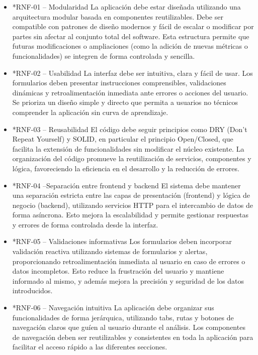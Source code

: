 \begin{itemize}

    \item*{RNF-01 – Modularidad}
    La aplicación debe estar diseñada utilizando una arquitectura modular basada en componentes reutilizables. Debe ser compatible con patrones de diseño modernos y fácil de escalar o modificar por partes sin afectar al conjunto total del software. Esta estructura permite que futuras modificaciones o ampliaciones (como la adición de nuevas métricas o funcionalidades) se integren de forma controlada y sencilla.
    
    \item*{RNF-02 – Usabilidad}
    La interfaz debe ser intuitiva, clara y fácil de usar. Los formularios deben presentar instrucciones comprensibles, validaciones dinámicas y retroalimentación inmediata ante errores o acciones del usuario. Se prioriza un diseño simple y directo que permita a usuarios no técnicos comprender la aplicación sin curva de aprendizaje.
    
    \item*{RNF-03 – Reusabilidad}
    El código debe seguir principios como DRY (Don’t Repeat Yourself) y SOLID, en particular el principio Open/Closed, que facilita la extensión de funcionalidades sin modificar el núcleo existente. La organización del código promueve la reutilización de servicios, componentes y lógica, favoreciendo la eficiencia en el desarrollo y la reducción de errores.
    
    \item*{RNF-04 –Separación entre frontend y backend}
    El sistema debe mantener una separación estricta entre las capas de presentación (frontend) y lógica de negocio (backend), utilizando servicios HTTP para el intercambio de datos de forma asíncrona. Esto mejora la escalabilidad y permite gestionar respuestas y errores de forma controlada desde la interfaz.
    
    \item*{RNF-05 – Validaciones informativas}
    Los formularios deben incorporar validación reactiva utilizando sistemas de formularios y alertas, proporcionando retroalimentación inmediata al usuario en caso de errores o datos incompletos. Esto reduce la frustración del usuario y mantiene informado al mismo, y además mejora la precisión y seguridad de los datos introducidos.
    
    \item*{RNF-06 – Navegación intuitiva}
    La aplicación debe organizar sus funcionalidades de forma jerárquica, utilizando tabs, rutas y botones de navegación claros que guíen al usuario durante el análisis. Los componentes de navegación deben ser reutilizables y consistentes en toda la aplicación para facilitar el acceso rápido a las diferentes secciones.

\end{itemize}


